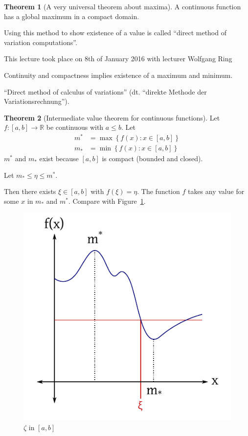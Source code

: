 \documentclass[a4paper,landscape,twocolumn]{article}
\theoremstyle{definition}
\newtheorem{theorem}{Theorem}
\newcommand\set[1]{\left\{#1\right\}}
\newcommand\meta[3]{\begin{mdframed}[skipbelow=4pt,skipabove=4pt,innermargin=1pt,innerleftmargin=1pt,innerrightmargin=1pt]\begin{center}\small{\textdownarrow{} This #1 took place on #2 with lecturer #3}\end{center}\end{mdframed}}
\begin{document}
\begin{theorem}[A very universal theorem about maxima]
  A continuous function has a global maximum in a compact domain.
\end{theorem}

Using this method to show existence of a value is called
\enquote{direct method of variation computations}.

\meta{lecture}{8th of January 2016}{Wolfgang Ring}
%
Continuity and compactness implies existence of a maximum and minimum.

\enquote{Direct method of calculus of variations} (dt. \foreignlanguage{ngerman}{\enquote{direkte Methode der Variationsrechnung}}).

\begin{theorem}[Intermediate value theorem for continuous functions]
  Let $f: [a, b] \to \mathbb R$ be continuous with $a \leq b$. Let
  \begin{align*}
    m^* &= \max\set{f(x): x \in [a, b]} \\
    m_* &= \min\set{f(x): x \in [a, b]}
  \end{align*}
  $m^*$ and $m_*$ exist because $[a, b]$ is compact (bounded and closed).

  Let $m_* \leq \eta \leq m^*$.

  Then there exists $\xi \in [a, b]$ with $f(\xi) = \eta$.
  The function $f$ takes any value for some $x$ in $m_*$ and $m^*$.
  Compare with Figure~\ref{img:zeta-in-ab}.

  \begin{figure}[!h]
    \begin{center}
      \includegraphics{img/zeta_in_ab_interval.pdf}
      \caption{$\zeta$ in $[a, b]$}
      \label{img:zeta-in-ab}
    \end{center}
  \end{figure}
\end{theorem}
\end{document}
